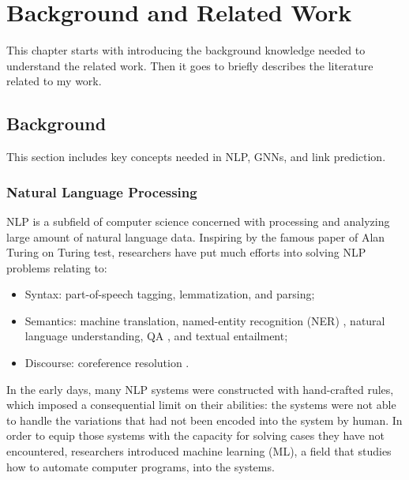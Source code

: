 \documentclass[12pt]{report}
\begin{document}
\chapter{Background and Related Work}
This chapter starts with introducing the background knowledge needed to understand the related work. Then it goes to briefly describes the literature related to my work.

\section{Background}
This section includes key concepts needed in NLP, GNNs, and link prediction.

\subsection{Natural Language Processing}
NLP is a subfield of computer science concerned with processing and analyzing large amount of natural language data. Inspiring by the famous paper of Alan Turing \cite{turing_i.computing_1950} on Turing test, researchers have put much efforts into solving NLP problems relating to:
\begin{itemize}
\item Syntax: part-of-speech tagging, lemmatization, and parsing;
\item Semantics: machine translation, named-entity recognition (NER) \cite{strubell_fast_2017}, natural language understanding, QA \cite{andrenucci_automated_2005}, and textual entailment;
\item Discourse: coreference resolution \cite{wiseman_learning_2016, clark_deep_2016, martschat_latent_2015}.
\end{itemize}

In the early days, many NLP systems were constructed with hand-crafted rules, which imposed a consequential limit on their abilities: the systems were not able to handle the variations that had not been encoded into the system by human. In order to equip those systems with the capacity for solving cases they have not encountered, researchers introduced machine learning (ML), a field that studies how to automate computer programs,
into the systems.
\end{document}
